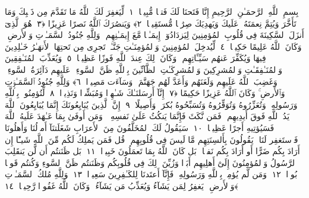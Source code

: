 
  
    
  
    
    

\nopagebreak
  بِسمِ ٱللَّهِ ٱلرَّحمَـٰنِ ٱلرَّحِيمِ
  إِنَّا فَتَحنَا لَكَ فَتحًۭا مُّبِينًۭا ﴿١﴾
 لِّيَغفِرَ لَكَ ٱللَّهُ مَا تَقَدَّمَ مِن ذَنۢبِكَ وَمَا تَأَخَّرَ وَيُتِمَّ نِعمَتَهُۥ عَلَيكَ وَيَهدِيَكَ صِرَٰطًۭا مُّستَقِيمًۭا ﴿٢﴾
 وَيَنصُرَكَ ٱللَّهُ نَصرًا عَزِيزًا ﴿٣﴾
 هُوَ ٱلَّذِىٓ أَنزَلَ ٱلسَّكِينَةَ فِى قُلُوبِ ٱلمُؤمِنِينَ لِيَزدَادُوٓا۟ إِيمَـٰنًۭا مَّعَ إِيمَـٰنِهِم ۗ وَلِلَّهِ جُنُودُ ٱلسَّمَـٰوَٟتِ وَٱلأَرضِ ۚ وَكَانَ ٱللَّهُ عَلِيمًا حَكِيمًۭا ﴿٤﴾
 لِّيُدخِلَ ٱلمُؤمِنِينَ وَٱلمُؤمِنَـٰتِ جَنَّـٰتٍۢ تَجرِى مِن تَحتِهَا ٱلأَنهَـٰرُ خَـٰلِدِينَ فِيهَا وَيُكَفِّرَ عَنهُم سَيِّـَٔاتِهِم ۚ وَكَانَ ذَٟلِكَ عِندَ ٱللَّهِ فَوزًا عَظِيمًۭا ﴿٥﴾
 وَيُعَذِّبَ ٱلمُنَـٰفِقِينَ وَٱلمُنَـٰفِقَـٰتِ وَٱلمُشرِكِينَ وَٱلمُشرِكَـٰتِ ٱلظَّآنِّينَ بِٱللَّهِ ظَنَّ ٱلسَّوءِ ۚ عَلَيهِم دَآئِرَةُ ٱلسَّوءِ ۖ وَغَضِبَ ٱللَّهُ عَلَيهِم وَلَعَنَهُم وَأَعَدَّ لَهُم جَهَنَّمَ ۖ وَسَآءَت مَصِيرًۭا ﴿٦﴾
 وَلِلَّهِ جُنُودُ ٱلسَّمَـٰوَٟتِ وَٱلأَرضِ ۚ وَكَانَ ٱللَّهُ عَزِيزًا حَكِيمًا ﴿٧﴾
 إِنَّآ أَرسَلنَـٰكَ شَـٰهِدًۭا وَمُبَشِّرًۭا وَنَذِيرًۭا ﴿٨﴾
 لِّتُؤمِنُوا۟ بِٱللَّهِ وَرَسُولِهِۦ وَتُعَزِّرُوهُ وَتُوَقِّرُوهُ وَتُسَبِّحُوهُ بُكرَةًۭ وَأَصِيلًا ﴿٩﴾
 إِنَّ ٱلَّذِينَ يُبَايِعُونَكَ إِنَّمَا يُبَايِعُونَ ٱللَّهَ يَدُ ٱللَّهِ فَوقَ أَيدِيهِم ۚ فَمَن نَّكَثَ فَإِنَّمَا يَنكُثُ عَلَىٰ نَفسِهِۦ ۖ وَمَن أَوفَىٰ بِمَا عَـٰهَدَ عَلَيهُ ٱللَّهَ فَسَيُؤتِيهِ أَجرًا عَظِيمًۭا ﴿١٠﴾
 سَيَقُولُ لَكَ ٱلمُخَلَّفُونَ مِنَ ٱلأَعرَابِ شَغَلَتنَآ أَموَٟلُنَا وَأَهلُونَا فَٱستَغفِر لَنَا ۚ يَقُولُونَ بِأَلسِنَتِهِم مَّا لَيسَ فِى قُلُوبِهِم ۚ قُل فَمَن يَملِكُ لَكُم مِّنَ ٱللَّهِ شَيـًٔا إِن أَرَادَ بِكُم ضَرًّا أَو أَرَادَ بِكُم نَفعًۢا ۚ بَل كَانَ ٱللَّهُ بِمَا تَعمَلُونَ خَبِيرًۢا ﴿١١﴾
 بَل ظَنَنتُم أَن لَّن يَنقَلِبَ ٱلرَّسُولُ وَٱلمُؤمِنُونَ إِلَىٰٓ أَهلِيهِم أَبَدًۭا وَزُيِّنَ ذَٟلِكَ فِى قُلُوبِكُم وَظَنَنتُم ظَنَّ ٱلسَّوءِ وَكُنتُم قَومًۢا بُورًۭا ﴿١٢﴾
 وَمَن لَّم يُؤمِنۢ بِٱللَّهِ وَرَسُولِهِۦ فَإِنَّآ أَعتَدنَا لِلكَـٰفِرِينَ سَعِيرًۭا ﴿١٣﴾
 وَلِلَّهِ مُلكُ ٱلسَّمَـٰوَٟتِ وَٱلأَرضِ ۚ يَغفِرُ لِمَن يَشَآءُ وَيُعَذِّبُ مَن يَشَآءُ ۚ وَكَانَ ٱللَّهُ غَفُورًۭا رَّحِيمًۭا ﴿١٤﴾
